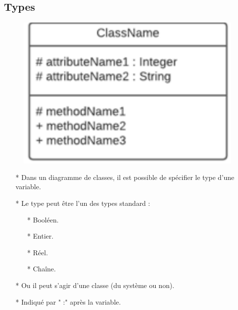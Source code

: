 \documentclass[12pt]{article}
\begin{document}
\subsection{Types}
\begin{figure}[!hbtp]
	\centering
	\includegraphics[scale=0.75]{Capture3.PNG}
\end{figure}
\begin{itemize}
	\item[* ] Dans un diagramme de classes, il est possible de spécifier le
	type d'une variable.
	\item[* ] Le type peut être l'un des types standard :
	\begin{itemize}
		\item[* ]  Booléen.
		\item[* ] Entier.
		\item[* ] Réel.
		\item[* ] Chaîne.
		
	\end{itemize}
\item[* ] Ou il peut s'agir d'une classe (du système ou non).
\item[* ] Indiqué par " :" après la variable.

\end{itemize}
\end{document}
